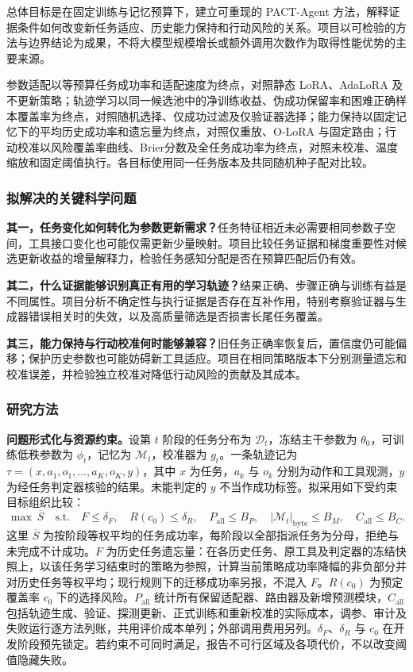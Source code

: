 总体目标是在固定训练与记忆预算下，建立可重现的 PACT-Agent 方法，解释证据条件如何改变新任务适应、历史能力保持和行动风险的关系。项目以可检验的方法与边界结论为成果，不将大模型规模增长或额外调用次数作为取得性能优势的主要来源。

参数适配以等预算任务成功率和适配速度为终点，对照静态 LoRA、AdaLoRA 及不更新策略；轨迹学习以同一候选池中的净训练收益、伪成功保留率和困难正确样本覆盖率为终点，对照随机选择、仅成功过滤及仅验证器选择；能力保持以固定记忆下的平均历史成功率和遗忘量为终点，对照仅重放、O-LoRA 与固定路由；行动校准以风险覆盖率曲线、Brier分数及全任务成功率为终点，对照未校准、温度缩放和固定阈值执行。各目标使用同一任务版本及共同随机种子配对比较。

\subsubsection{拟解决的关键科学问题}

\textbf{其一，任务变化如何转化为参数更新需求？}任务特征相近未必需要相同参数子空间，工具接口变化也可能仅需更新少量映射。项目比较任务证据和梯度重要性对候选更新收益的增量解释力，检验任务感知分配是否在预算匹配后仍有效。

\textbf{其二，什么证据能够识别真正有用的学习轨迹？}结果正确、步骤正确与训练有益是不同属性。项目分析不确定性与执行证据是否存在互补作用，特别考察验证器与生成器错误相关时的失效，以及高质量筛选是否损害长尾任务覆盖。

\textbf{其三，能力保持与行动校准何时能够兼容？}旧任务正确率恢复后，置信度仍可能偏移；保护历史参数也可能妨碍新工具适应。项目在相同策略版本下分别测量遗忘和校准误差，并检验独立校准对降低行动风险的贡献及其成本。

\subsubsection{研究方法}

\textbf{问题形式化与资源约束。}设第 $t$ 阶段的任务分布为 $\mathcal{D}_t$，冻结主干参数为 $\theta_0$，可训练低秩参数为 $\phi_t$，记忆为 $\mathcal{M}_t$，校准器为 $g_t$。一条轨迹记为 $\tau=(x,a_1,o_1,\ldots,a_K,o_K,y)$，其中 $x$ 为任务，$a_k$ 与 $o_k$ 分别为动作和工具观测，$y$ 为经任务判定器核验的结果。未能判定的 $y$ 不当作成功标签。拟采用如下受约束目标组织比较：
\begin{equation}
\max\ \overline{S}\quad
\text{s.t.}\quad F\leq\delta_F,\quad R(c_0)\leq\delta_R,\quad
P_{\mathrm{all}}\leq B_P,\quad |\mathcal{M}_t|_{\mathrm{byte}}\leq B_M,\quad C_{\mathrm{all}}\leq B_C .
\end{equation}
这里 $\overline{S}$ 为按阶段等权平均的任务成功率，每阶段以全部指派任务为分母，拒绝与未完成不计成功。$F$ 为历史任务遗忘量：在各历史任务、原工具及判定器的冻结快照上，以该任务学习结束时的策略为参照，计算当前策略成功率降幅的非负部分并对历史任务等权平均；现行规则下的迁移成功率另报，不混入 $F$。$R(c_0)$ 为预定覆盖率 $c_0$ 下的选择风险。$P_{\mathrm{all}}$ 统计所有保留适配器、路由器及新增预测模块，$C_{\mathrm{all}}$ 包括轨迹生成、验证、探测更新、正式训练和重新校准的实际成本，调参、审计及失败运行逐方法列账，共用评价成本单列；外部调用费用另列。$\delta_F$、$\delta_R$ 与 $c_0$ 在开发阶段预先锁定。若约束不可同时满足，报告不可行区域及各项代价，不以改变阈值隐藏失败。

